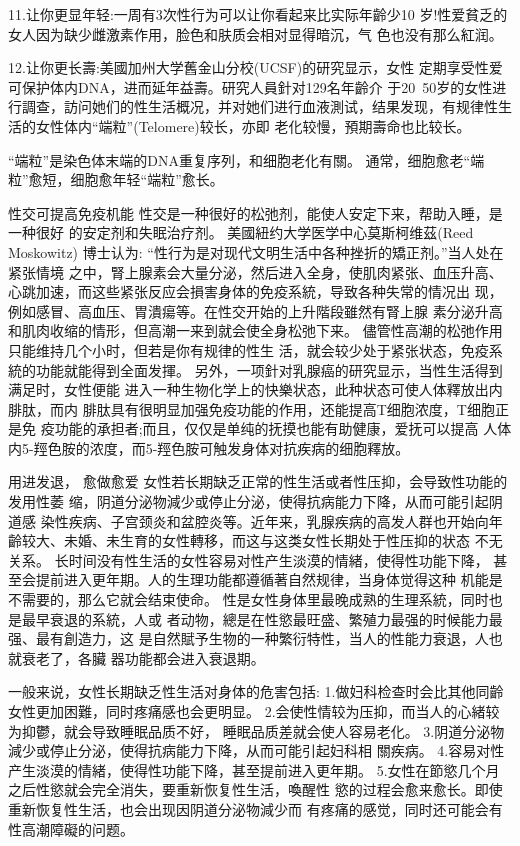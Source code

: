 \documentclass[12pt,UTF8]{ctexbook}
\begin{document}
11.让你更显年轻:一周有3次性行为可以让你看起来比实际年齡少10
岁!性爱貧乏的女人因为缺少雌激素作用，脸色和肤质会相对显得暗沉，气
色也没有那么紅润。

12.让你更长壽:美國加州大学舊金山分校(UCSF)的研究显示，女性
定期享受性爱可保护体内DNA，进而延年益壽。研究人員針对129名年齡介
于20~50岁的女性进行調查，訪问她们的性生活概况，并对她们进行血液測试，结果发现，有规律性生活的女性体内“端粒”(Telomere)较长，亦即
老化较慢，預期壽命也比较长。

“端粒”是染色体末端的DNA重复序列，和细胞老化有關。
通常，细胞愈老“端粒”愈短，细胞愈年轻“端粒”愈长。

性交可提高免疫机能
性交是一种很好的松弛剂，能使人安定下来，帮助入睡，是一种很好
的安定剂和失眠治疗剂。
美國紐约大学医学中心莫斯柯维茲(Reed Moskowitz) 博士认为:
“性行为是对现代文明生活中各种挫折的矯正剂。”当人处在紧张情境
之中，腎上腺素会大量分泌，然后进入全身，使肌肉紧张、血压升高、心跳加速，而这些紧张反应会損害身体的免疫系統，导致各种失常的情况出
现，例如感冒、高血压、胃潰瘍等。在性交开始的上升階段雖然有腎上腺
素分泌升高和肌肉收缩的情形，但高潮一来到就会使全身松弛下来。
儘管性高潮的松弛作用只能维持几个小时，但若是你有规律的性生
活，就会较少处于紧张状态，免疫系統的功能就能得到全面发揮。
另外，一项針对乳腺癌的研究显示，当性生活得到满足时，女性便能
进入一种生物化学上的快樂状态，此种状态可使人体釋放出内腓肽，而内
腓肽具有很明显加强免疫功能的作用，还能提高T细胞浓度，T细胞正是免
疫功能的承担者;而且，仅仅是单纯的抚摸也能有助健康，爱抚可以提高
人体内5-羥色胺的浓度，而5-羥色胺可触发身体对抗疾病的细胞釋放。

用进发退，
愈做愈爱
女性若长期缺乏正常的性生活或者性压抑，会导致性功能的发用性萎
缩，阴道分泌物減少或停止分泌，使得抗病能力下降，从而可能引起阴道感
染性疾病、子宫颈炎和盆腔炎等。近年来，乳腺疾病的高发人群也开始向年
齡较大、未婚、未生育的女性轉移，而这与这类女性长期处于性压抑的状态
不无关系。
长时间没有性生活的女性容易对性产生淡漠的情緒，使得性功能下降，
甚至会提前进入更年期。人的生理功能都遵循著自然规律，当身体觉得这种
机能是不需要的，那么它就会结束使命。
性是女性身体里最晚成熟的生理系統，同时也是最早衰退的系統，人或
者动物，總是在性慾最旺盛、繁殖力最强的时候能力最强、最有創造力，这
是自然賦予生物的一种繁衍特性，当人的性能力衰退，人也就衰老了，各臟
器功能都会进入衰退期。

一般来说，女性长期缺乏性生活对身体的危害包括:
1.做妇科检查时会比其他同齡女性更加困難，同时疼痛感也会更明显。
2.会使性情较为压抑，而当人的心緒较为抑鬱，就会导致睡眠品质不好，
睡眠品质差就会使人容易老化。
3.阴道分泌物減少或停止分泌，使得抗病能力下降，从而可能引起妇科相
關疾病。
4.容易对性产生淡漠的情緒，使得性功能下降，甚至提前进入更年期。
5.女性在節慾几个月之后性慾就会完全消失，要重新恢复性生活，喚醒性
慾的过程会愈来愈长。即使重新恢复性生活，也会出现因阴道分泌物減少而
有疼痛的感觉，同时还可能会有性高潮障礙的问题。
\end{document}
